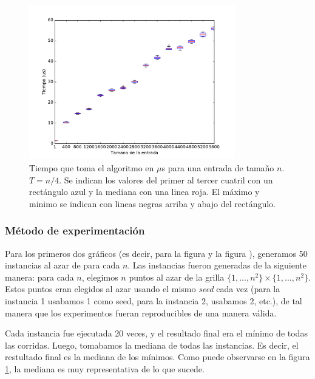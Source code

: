 \begin{figure}[H]
 \centering
	\includegraphics[width=0.8\textwidth]{img/tiempos/genkidama3.pdf}
	\caption{\footnotesize Tiempo que toma el algoritmo en $\mu$s para una entrada de tamaño $n$. $T = n/4$. Se indican los valores del primer al tercer cuatril con un rectángulo azul y la mediana con una linea roja. El máximo y minimo se indican con lineas negras arriba y abajo del rectángulo.}
	\label{fig:genkidama-tiempos3}
\end{figure}

\subsubsection{M\'etodo de experimentación}

Para los primeros dos gráficos (es decir, para la figura \label{fig:genkidama-tiempos1} y la figura \label{fig:genkidama-tiempos2}), generamos 50 instancias al azar de para cada $n$.
Las instancias fueron generadas de la siguiente manera: para cada $n$, elegimos $n$ puntos al azar de la grilla $\{1,..., n^2\} \times \{1, ... , n^2\}$.
Estos puntos eran elegidos al azar usando el mismo \emph{seed} cada vez (para la instancia 1 usabamos 1 como seed, para la instancia 2, usabamos 2, etc.), de tal manera que los experimentos fueran reproducibles de una manera válida.

Cada instancia fue ejecutada 20 veces, y el resultado final era el mínimo de todas las corridas.
Luego, tomabamos la mediana de todas las instancias.
Es decir, el restultado final es la mediana de los mínimos. Como puede observarse en la figura \ref{fig:genkidama-tiempos3}, la mediana es muy representativa de lo que sucede.
